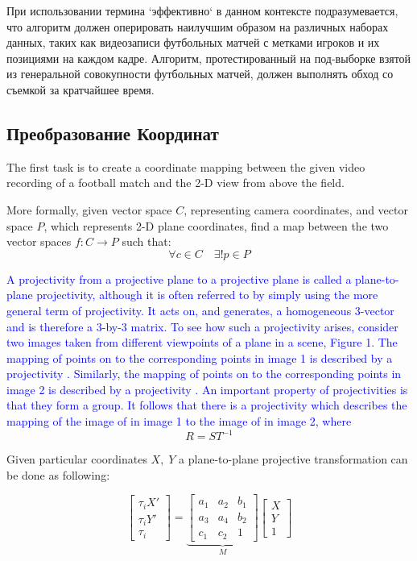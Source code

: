 При использовании термина `эффективно`  в данном контексте подразумевается, что алгоритм должен оперировать наилучшим образом на различных наборах данных, таких как видеозаписи футбольных матчей с метками игроков и их позициями на каждом кадре. Алгоритм, протестированный на под-выборке взятой из генеральной совокупности футбольных матчей, должен выполнять обход со съемкой за кратчайшее время.

\subsection{Преобразование Координат}
The first task is to create a coordinate mapping between the given video recording of a football match and the 2-D view from above the field. 

More formally, given vector space $C$, representing camera coordinates, and vector space $P$, which represents 2-D plane coordinates, find a map between the two vector spaces $f:C \rightarrow P$ such that: 
$$
\forall c \in C \quad \exists! p \in P 
$$

\textcolor{blue} {A projectivity from a projective plane to a projective plane is called a plane-to-plane projectivity, although it is often referred to by simply using the more general term of projectivity. It acts on, and generates, a homogeneous 3-vector and is therefore a 3-by-3 matrix.
To see how such a projectivity arises, consider two images taken from different viewpoints of a plane in a scene, Figure 1. The mapping of points on to the corresponding points in image 1 is described by a projectivity . Similarly, the mapping of points on to the corresponding points in image 2 is described by a projectivity . An important property of projectivities is that they form a group. It follows that there is a projectivity which describes the mapping of the image of in image 1 to the image of in image 2, where} 
$$ R = ST^{-1}$$

Given particular coordinates $X,\;Y$ a plane-to-plane projective transformation can be done as following:

$$
\begin{bmatrix}
\tau_{i}X' \\
\tau_{i}Y' \\
\tau_{i}
\end{bmatrix} = 
\underbrace{ \begin{bmatrix}
a_{1} & a_{2} & b_{1} \\
a_{3} & a_{4} & b_{2} \\
c_{1} & c_{2} & 1
\end{bmatrix} }_{ M } \begin{bmatrix}
X \\
Y \\
1
\end{bmatrix}
$$

